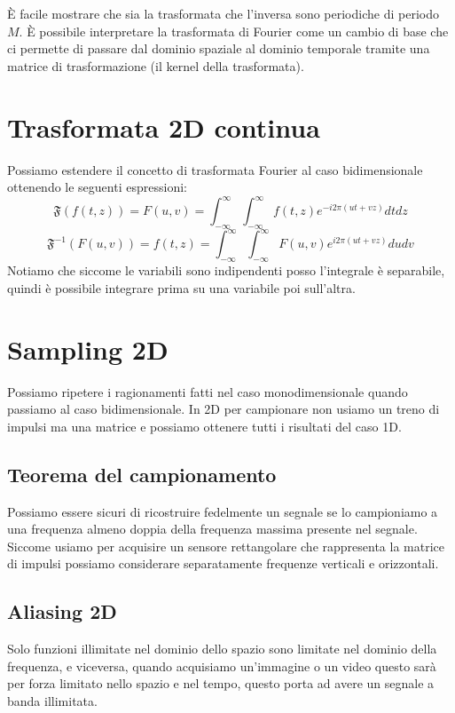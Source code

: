 È facile mostrare che sia la trasformata che l'inversa sono periodiche di periodo $M$. È possibile interpretare la trasformata di Fourier come un cambio di base che ci permette di passare dal dominio spaziale al dominio temporale tramite una matrice di trasformazione (il kernel della trasformata).

\section{Trasformata 2D continua}
Possiamo estendere il concetto di trasformata Fourier al caso bidimensionale ottenendo le seguenti espressioni:
\begin{equation}
	\mathfrak{F}(f(t,z)) = F(u,v) = \int_{-\infty}^{\infty}\int_{-\infty}^{\infty} f(t, z)  e^{-i2\pi (ut + vz)} dt dz
\end{equation}
\begin{equation}
	\mathfrak{F}^{-1}(F(u,v)) = f(t,z) = \int_{-\infty}^{\infty}\int_{-\infty}^{\infty} F(u,v)  e^{i2\pi (ut + vz)} du dv
\end{equation}
Notiamo che siccome le variabili sono indipendenti posso l'integrale è separabile, quindi è possibile integrare prima su una variabile poi sull'altra.

\section{Sampling 2D}
Possiamo ripetere i ragionamenti fatti nel caso monodimensionale quando passiamo al caso bidimensionale. In 2D per campionare non usiamo un treno di impulsi ma una matrice e possiamo ottenere tutti i risultati del caso 1D.
\subsection{Teorema del campionamento}
Possiamo essere sicuri di ricostruire fedelmente un segnale se lo campioniamo a una frequenza almeno doppia della frequenza massima presente nel segnale. Siccome usiamo per acquisire un sensore rettangolare che rappresenta la matrice di impulsi possiamo considerare separatamente frequenze verticali e orizzontali.
\subsection{Aliasing 2D}
Solo funzioni illimitate nel dominio dello spazio sono limitate nel dominio della frequenza, e viceversa, quando acquisiamo un'immagine o un video questo sarà per forza limitato nello spazio e nel tempo, questo porta ad avere un segnale a banda illimitata.

